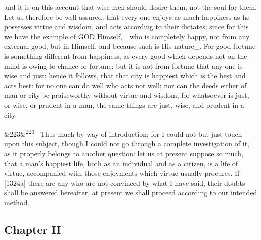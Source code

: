 \documentclass[12pt]{article}
\newcommand{\para}[1][]{\par\noindent\ifx&#1&\else\textsuperscript{\footnotesize #1}~\fi}
\begin{document}
and it is on this account that wise men should desire them, not the soul for them. Let us therefore be well assured, that every one enjoys as much happiness as he possesses virtue and wisdom, and acts according to their dictates; since for this we have the example of GOD Himself, \_who is completely happy, not from any external good, but in Himself, and because such is His nature\_. For good fortune is something different from happiness, as every good which depends not on the mind is owing to chance or fortune; but it is not from fortune that any one is wise and just: hence it follows, that that city is happiest which is the best and acts best: for no one can do well who acts not well; nor can the deeds either of man or city be praiseworthy without virtue and wisdom; for whatsoever is just, or wise, or prudent in a man, the same things are just, wise, and prudent in a city.

\para[223] Thus much by way of introduction; for I could not but just touch upon this subject, though I could not go through a complete investigation of it, as it properly belongs to another question: let us at present suppose so much, that a man's happiest life, both as an individual and as a citizen, is a life of virtue, accompanied with those enjoyments which virtue usually procures. If [1324a] there are any who are not convinced by what I have said, their doubts shall be answered hereafter, at present we shall proceed according to our intended method.

\subsection*{Chapter II}
\end{document}
